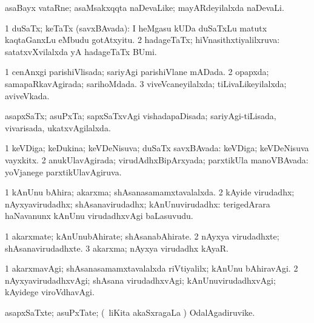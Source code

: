 \bentry
{}
\gl{\nA}
\bmng
asaBayx vataRne; asaMsakxqqta naDevaLike; mayARdeyilalxda naDevaLi. 
\emng
\eentry

\bentry
{}
\gl{\gu}
\bmng
\bnum
\num{1} duSaTx; keTaTx (savxBAvada):  I heMgasu kUDa duSaTxLu matutx kaqtaGanxLu eMbudu gotAtxyitu. 
\num{2} hadageTaTx; hiVnasithxtiyalilxruva:  satatxvXvilalxda yA hadageTaTx BUmi. 
\enum
\emng
\eentry

\bentry
{}
\gl{\gu}
\bmng
\bnum
\num{1} cenAnxgi parishiVlisada; sariyAgi parishiVlane mADada. 
\num{2} opapxda; samapaRkavAgirada; sarihoMdada. 
\num{3} viveVcaneyilalxda; tiLivaLikeyilalxda; aviveVkada. 
\enum
\emng
\eentry

\bentry
{}
\gl{\gu}
\bmng
asapxSaTx; asuPxTa; sapxSaTxvAgi vishadapaDisada; sariyAgi-tiLisada, vivarisada, ukatxvAgilalxda. 
\emng
\eentry

\bentry
{}
\gl{\gu}
\bmng
\bnum
\num{1} keVDiga; keDukina; keVDeNisuva; duSaTx savxBAvada:  keVDiga; keVDeNisuva vayxkitx. 
\num{2} anukUlavAgirada; virudAdhxBipArxyada; parxtikUla manoVBAvada:  yoVjanege parxtikUlavAgiruva. 
\enum
\emng
\eentry

\bentry
{}
\gl{\gu}
\bmng
\bnum
\num{1} kAnUnu bAhira; akarxma; shAsanasamamxtavalalxda. 
\num{2} kAyide virudadhx; nAyxyavirudadhx; shAsanavirudadhx; kAnUnuvirudadhx:  terigedArara haNavanunx kAnUnu virudadhxvAgi baLasuvudu. 
\enum
\emng
\eentry

\bentry
{}
\gl{\nA}
\bmng
\bnum
\num{1} akarxmate; kAnUnubAhirate; shAsanabAhirate. 
\num{2} nAyxya virudadhxte; shAsanavirudadhxte. 
\num{3} akarxma; nAyxya virudadhx kAyaR. 
\enum
\emng
\eentry

\bentry
{}
\gl{\kirxvi}
\bmng
\bnum
\num{1} akarxmavAgi; shAsanasamamxtavalalxda riVtiyalilx; kAnUnu bAhiravAgi. 
\num{2} nAyxyavirudadhxvAgi; shAsana virudadhxvAgi; kAnUnuvirudadhxvAgi; kAyidege viroVdhavAgi. 
\enum
\emng
\eentry

\bentry
{}
\gl{\nA}
\bmng
asapxSaTxte; asuPxTate; (\kanmu\ liKita akaSxragaLa \vi) OdalAgadiruvike. 
\emng
\eentry

